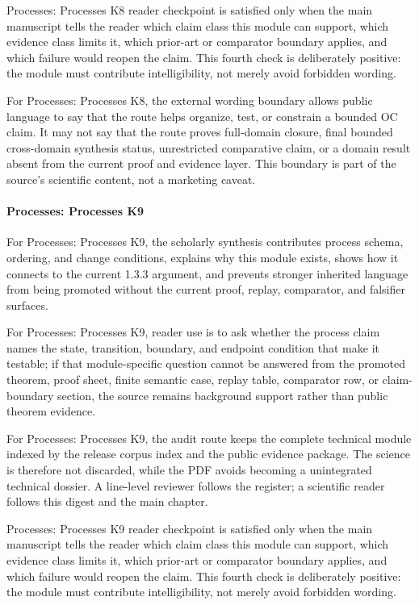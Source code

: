 Processes: Processes K8 reader checkpoint is satisfied only when the main manuscript tells the reader which claim class this module can support, which evidence class limits it, which prior-art or comparator boundary applies, and which failure would reopen the claim. This fourth check is deliberately positive: the module must contribute intelligibility, not merely avoid forbidden wording.


For Processes: Processes K8, the external wording boundary allows public language to say that the route helps organize, test, or constrain a bounded OC claim. It may not say that the route proves full-domain closure, final bounded cross-domain synthesis status, unrestricted comparative claim, or a domain result absent from the current proof and evidence layer. This boundary is part of the source's scientific content, not a marketing caveat.


\paragraph{Processes: Processes K9}

For Processes: Processes K9, the scholarly synthesis contributes process schema, ordering, and change conditions, explains why this module exists, shows how it connects to the current 1.3.3 argument, and prevents stronger inherited language from being promoted without the current proof, replay, comparator, and falsifier surfaces.


For Processes: Processes K9, reader use is to ask whether the process claim names the state, transition, boundary, and endpoint condition that make it testable; if that module-specific question cannot be answered from the promoted theorem, proof sheet, finite semantic case, replay table, comparator row, or claim-boundary section, the source remains background support rather than public theorem evidence.


For Processes: Processes K9, the audit route keeps the complete technical module indexed by the release corpus index and the public evidence package. The science is therefore not discarded, while the PDF avoids becoming a unintegrated technical dossier. A line-level reviewer follows the register; a scientific reader follows this digest and the main chapter.


Processes: Processes K9 reader checkpoint is satisfied only when the main manuscript tells the reader which claim class this module can support, which evidence class limits it, which prior-art or comparator boundary applies, and which failure would reopen the claim. This fourth check is deliberately positive: the module must contribute intelligibility, not merely avoid forbidden wording.


